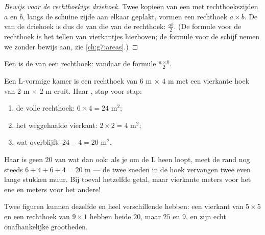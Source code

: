 \begin{proof}[Bewijs voor de rechthoekige driehoek]
Twee kopieën van een  met rechthoekszijden $a$ en $b$,
langs de schuine zijde aan elkaar geplakt, vormen een rechthoek $a \times b$. De
 van de driehoek is dus de  van die van de rechthoek:
$\frac{ab}{2}$. (De formule voor de rechthoek is het tellen van vierkantjes
hierboven; de formule voor de schijf nemen we zonder bewijs aan, zie
\cref{ch:g7:areas}.)
\end{proof}

\begin{omfigure}

{\small Een  is de  van een rechthoek: vandaar de
formule $\frac{a\times b}{2}$.}
\end{omfigure}

\begin{example}\label{ex:g6:measure:composite}
Een L-vormige kamer is een rechthoek van $6$ m $\times$ $4$ m met een vierkante
hoek van $2$ m $\times$ $2$ m eruit. Haar , stap voor stap:
\begin{enumerate}
  \item de volle rechthoek: $6 \times 4 = 24$ m$^2$;
  \item het weggehaalde vierkant: $2 \times 2 = 4$ m$^2$;
  \item wat overblijft: $24 - 4 = 20$ m$^2$.
\end{enumerate}
Haar \emph{} is geen $20$ van wat dan ook: als je om de L heen loopt, meet
de rand nog steeds $6 + 4 + 6 + 4 = 20$ m --- de twee sneden in de hoek
vervangen twee even lange stukken muur. Bij toeval hetzelfde getal, maar
vierkante meters voor het ene en meters voor het andere!
\end{example}

\begin{remark}
Twee figuren kunnen dezelfde  en heel verschillende  hebben:
een vierkant van $5 \times 5$ en een rechthoek van $9 \times 1$ hebben beide
 $20$, maar  $25$ en $9$.  en  zijn echt
onafhankelijke grootheden.
\end{remark}

